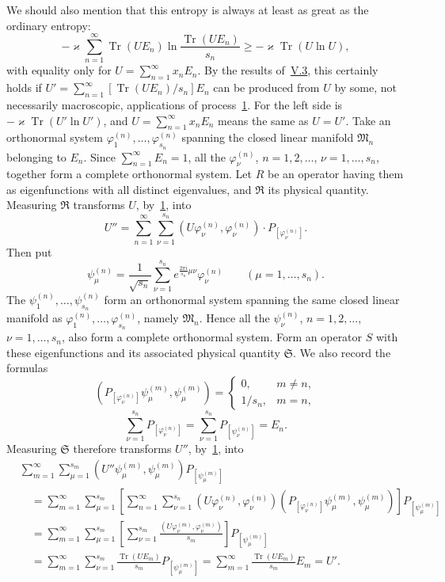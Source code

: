 \documentclass[fontsize=13pt,twoside,openany,headings=normal,parskip=false,bookmarkpackage=false,DIV=calc]{scrbook}
\begin{document}
We should also mention that this entropy is always at least as great as the ordinary entropy:
\[
-\varkappa\sum_{n=1}^{\infty}\operatorname{Tr}(UE_n)
\ln\frac{\operatorname{Tr}(UE_n)}{s_n}
\geq-\varkappa\operatorname{Tr}(U\ln U),
\]
with equality only for $U=\sum_{n=1}^{\infty}x_nE_n$. By the results of~\hyperref[sec:V.3]{V.3}, this certainly holds if $U'=\sum_{n=1}^{\infty}[\operatorname{Tr}(UE_n)/s_n]E_n$ can be produced from $U$ by some, not necessarily macroscopic, applications of process~\hyperref[eq:V.1.1]{1}. For the left side is $-\varkappa\operatorname{Tr}(U'\ln U')$, and $U=\sum_{n=1}^{\infty}x_nE_n$ means the same as $U=U'$. Take an orthonormal system $\varphi_1^{(n)},\ldots,\varphi_{s_n}^{(n)}$ spanning the closed linear manifold $\mathfrak M_n$ belonging to $E_n$. Since $\sum_{n=1}^{\infty}E_n=1$, all the $\varphi_\nu^{(n)}$, $n=1,2,\ldots$, $\nu=1,\ldots,s_n$, together form a complete orthonormal system. Let $R$ be an operator having them as eigenfunctions with all distinct eigenvalues, and $\mathfrak R$ its physical quantity. Measuring $\mathfrak R$ transforms $U$, by~\hyperref[eq:V.1.1]{1}, into
\[
U''=\sum_{n=1}^{\infty}\sum_{\nu=1}^{s_n}
(U\varphi_\nu^{(n)},\varphi_\nu^{(n)})\cdot P_{[\varphi_\nu^{(n)}]}.
\]
Then put
\[
\psi_\mu^{(n)}=\frac1{\sqrt{s_n}}\sum_{\nu=1}^{s_n}
 e^{\frac{2\pi i}{s_n}\mu\nu}\varphi_\nu^{(n)}
\qquad(\mu=1,\ldots,s_n).
\]
The $\psi_1^{(n)},\ldots,\psi_{s_n}^{(n)}$ form an orthonormal system spanning the same closed linear manifold as $\varphi_1^{(n)},\ldots,\varphi_{s_n}^{(n)}$, namely $\mathfrak M_n$. Hence all the $\psi_\nu^{(n)}$, $n=1,2,\ldots$, $\nu=1,\ldots,s_n$, also form a complete orthonormal system. Form an operator $S$ with these eigenfunctions and its associated physical quantity $\mathfrak S$. We also record the formulas
\[
(P_{[\varphi_\nu^{(n)}]}\psi_\mu^{(m)},\psi_\mu^{(m)})
=\begin{cases}0,&m\ne n,\\1/s_n,&m=n,\end{cases}
\]
\[
\sum_{\nu=1}^{s_n}P_{[\varphi_\nu^{(n)}]}
=\sum_{\nu=1}^{s_n}P_{[\psi_\nu^{(n)}]}=E_n.
\]
\hypertarget{origpage-221}{}%
Measuring $\mathfrak S$ therefore transforms $U''$, by~\hyperref[eq:V.1.1]{1}, into
\begin{align*}
&\sum_{m=1}^{\infty}\sum_{\mu=1}^{s_m}(U''\psi_\mu^{(m)},\psi_\mu^{(m)})P_{[\psi_\mu^{(m)}]}\\
&\quad=\sum_{m=1}^{\infty}\sum_{\mu=1}^{s_m}
\left[\sum_{n=1}^{\infty}\sum_{\nu=1}^{s_n}(U\varphi_\nu^{(n)},\varphi_\nu^{(n)})
(P_{[\varphi_\nu^{(n)}]}\psi_\mu^{(m)},\psi_\mu^{(m)})\right]P_{[\psi_\mu^{(m)}]}\\
&\quad=\sum_{m=1}^{\infty}\sum_{\mu=1}^{s_m}
\left[\sum_{\nu=1}^{s_m}\frac{(U\varphi_\nu^{(m)},\varphi_\nu^{(m)})}{s_m}\right]P_{[\psi_\mu^{(m)}]}\\
&\quad=\sum_{m=1}^{\infty}\sum_{\nu=1}^{s_m}
\frac{\operatorname{Tr}(UE_m)}{s_m}P_{[\psi_\mu^{(m)}]}
=\sum_{m=1}^{\infty}\frac{\operatorname{Tr}(UE_m)}{s_m}E_m=U'.
\end{align*}
\end{document}
